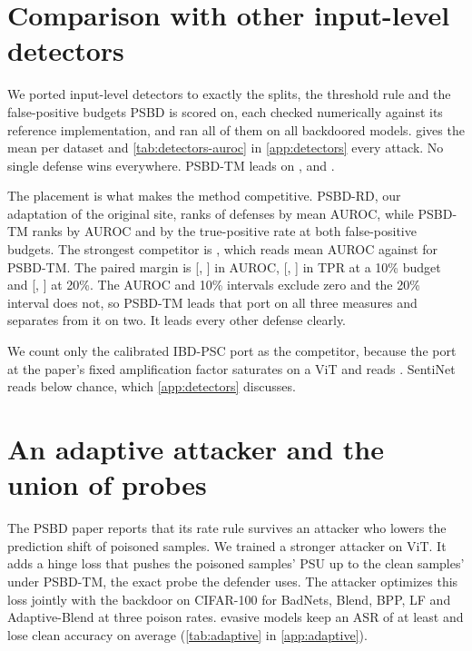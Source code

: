 \section{Comparison with other input-level detectors}
\label{sec:robustness:detectors}\label{sec:detectors}

We ported \DetectorsComparedCount{} input-level detectors to exactly the splits, the threshold rule and the false-positive budgets PSBD is scored on, each checked numerically against its reference implementation, and ran all of them on all \DetectorsComparedModels{} backdoored models.  gives the mean per dataset and \cref{tab:detectors-auroc} in \cref{app:detectors} every attack. No single defense wins everywhere. PSBD-TM leads on \DetectorsAurocDatasetsOursLeads{}, and \DetectorsAurocDatasetsOthersLead{}.



The placement is what makes the method competitive. PSBD-RD, our adaptation of the original site, ranks \DetectorsAurocRankPublished{} of \DetectorsAurocDefensesRanked{} defenses by mean AUROC, while PSBD-TM ranks \DetectorsAurocRankOurs{} by AUROC and by the true-positive rate at both false-positive budgets. The strongest competitor is \DetectorsAurocBestCompetitorName{}, which reads \DetectorsAurocBestCompetitor{} mean AUROC against \DetectorsAurocOurs{} for PSBD-TM. The paired margin is \DetectorsAurocMargin{} [\DetectorsAurocMarginLow{}, \DetectorsAurocMarginHigh{}] in AUROC, \DetectorsTprOneZeroMargin{} [\DetectorsTprOneZeroMarginLow{}, \DetectorsTprOneZeroMarginHigh{}] in TPR at a 10\% budget and \DetectorsTprTwoZeroMargin{} [\DetectorsTprTwoZeroMarginLow{}, \DetectorsTprTwoZeroMarginHigh{}] at 20\%. The AUROC and 10\% intervals exclude zero and the 20\% interval does not, so PSBD-TM leads that port on all three measures and separates from it on two. It leads every other defense clearly.

We count only the calibrated IBD-PSC port as the competitor, because the port at the paper's fixed amplification factor saturates on a ViT and reads \DetectorsAurocIbdPsc{}. SentiNet reads below chance, which \cref{app:detectors} discusses.

\section{An adaptive attacker and the union of probes}
\label{sec:robustness:adaptive}

The PSBD paper reports that its rate rule survives an attacker who lowers the prediction shift of poisoned samples. We trained a stronger attacker on ViT. It adds a hinge loss that pushes the poisoned samples' PSU up to the clean samples' under PSBD-TM, the exact probe the defender uses. The attacker optimizes this loss jointly with the backdoor on CIFAR-100 for BadNets, Blend, BPP, LF and Adaptive-Blend at three poison rates. \AdaptiveVitCells{} evasive models keep an ASR of at least \AdaptiveHighAsr{} and lose \AdaptiveVitCaCost{} clean accuracy on average (\cref{tab:adaptive} in \cref{app:adaptive}).

